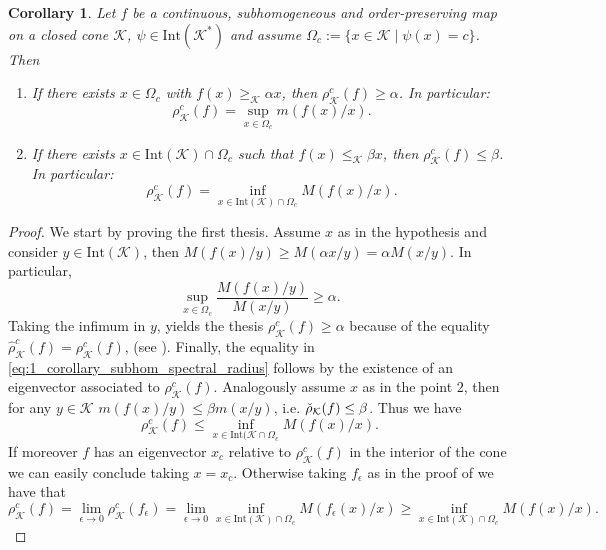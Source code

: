 \documentclass{article}
\newtheorem{corollary}[theorem]{Corollary}
\newcommand{\cradius}{\rho_{\cone}}
\newcommand{\cgradius}{\widehat{\rho}_{\cone}}
\newcommand{\cdradius}{\Check{\rho}_{\cone}}
\newcommand{\cone}{\mathcal{K}}
\newcommand{\interior}{\mathrm{Int}}
\newcommand{\cgeq}{\geq_{\cone}}
\newcommand{\cleq}{\leq_{\cone}}
\begin{document}
%
\begin{corollary}\label{Corollary_Collatz-Wielandt_for_cshop_functions}
    Let $f$ be a continuous, subhomogeneous and order-preserving map on a closed cone $\cone$, $\psi\in\interior(\cone^*)$ and assume $\Omega_c:=\{x\in\cone\;|\;\psi(x)=c\}$. Then 
    \begin{enumerate}
        \item If there exists $x\in\Omega_c$ with $f(x)\cgeq \alpha x$, then $\cradius^c(f)\geq \alpha$. In particular: 
        \begin{equation}\label{eq:1_corollary_subhom_spectral_radius}
            \cradius^c(f)=\sup_{x\in\Omega_c}m(f(x)/x).
        \end{equation}
        \item If there exists $x\in\interior(\cone)\cap\Omega_c$ such that $f(x)\cleq \beta x$, then $\cradius^c(f)\leq \beta$. In particular: 
        \begin{equation}\label{eq:2_corollary_subhom_spectral_radius}         \cradius^c(f)=\inf_{x\in\interior(\cone)\cap\Omega_c}M(f(x)/x).
        \end{equation}
    \end{enumerate}
\end{corollary}
%
\begin{proof}
We start by proving the first thesis. Assume $x$ as in the hypothesis and consider $y\in \interior(\cone)$, then $M(f(x)/y)\geq M(\alpha x/y)=\alpha M(x/y)$.
    In particular, 
    \begin{equation}
        \sup_{x\in \Omega_c}\frac{M(f(x)/y)}{M(x/y)}\geq \alpha.
    \end{equation} 
Taking the infimum in $y$, yields the thesis $\cradius^c(f)\geq \alpha$ because of the equality $\cgradius^c(f)=\cradius^c(f)$, (see ). Finally, the equality in \eqref{eq:1_corollary_subhom_spectral_radius} follows by the existence of an eigenvector associated to $\cradius^c(f)$.
Analogously assume $x$ as in the point $2$, then for any $y\in \cone$ $m(f(x)/y)\leq \beta m(x/y)$, i.e. $\cdradius(f)\leq \beta$. Thus we have 
\begin{equation}
    \cradius^c(f)\leq \inf_{x\in\interior(\cone
    \cap\Omega_c}M(f(x)/x).
\end{equation}
If moreover $f$ has an eigenvector $x_c$ relative to $\cradius^c(f)$ in the interior of the cone we can easily conclude taking $x=x_c$. Otherwise taking $f_{\epsilon}$ as in the proof of  we have that 
\begin{equation}
    \cradius^c(f)=\lim_{\epsilon \rightarrow 0}\cradius^c(f_\epsilon)=\lim_{\epsilon\rightarrow 0}\inf_{x\in\interior(\cone)\cap\Omega_c}M(f_\epsilon(x)/x)\geq \inf_{x\in\interior(\cone)\cap\Omega_c}M(f(x)/x).
\end{equation}
\end{proof}
\end{document}
